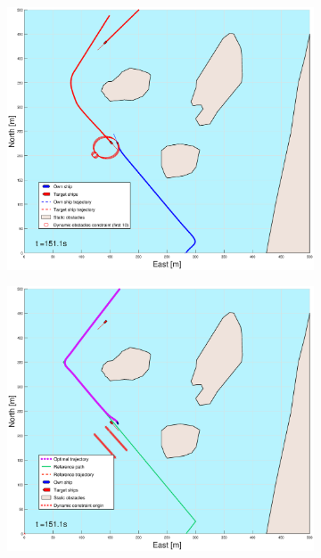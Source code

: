 \begin{figure}[ht]
\begin{subfigure}[b]{0.499\textwidth}
    \end{subfigure}
    \hfill
    \\ 
    \begin{subfigure}[b]{0.49\textwidth}
        \centering
        \includegraphics[width=\textwidth]{Images/Figures/Helloya/_Simple_1fig1_time=151}
    \end{subfigure}
    \hfill
    \begin{subfigure}[b]{0.499\textwidth}
        \centering
        \includegraphics[width=\textwidth]{Images/Figures/Helloya/_Simple_1fig999_time=151}
    \end{subfigure}
    \hfill
\end{figure}
